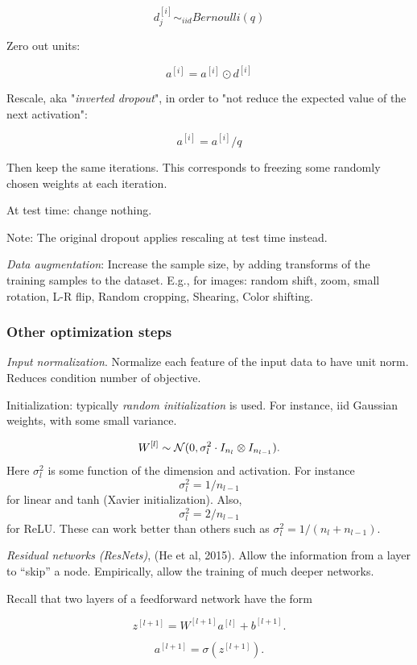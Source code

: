 \documentclass[english]{article}
\begin{document}
$$ d^{[i]}_j \sim_{iid} Bernoulli(q)$$

Zero out units:

$$a^{[i]} = a^{[i]}\odot d^{[i]}$$

Rescale, aka "\emph{inverted dropout}", in order to "not reduce the expected value of the next activation": 

$$a^{[i]} = a^{[i]}/q$$


Then keep the same iterations. This corresponds to freezing some randomly chosen weights at each iteration.

At test time: change nothing. 

Note: The original dropout applies rescaling at test time instead. 

\item 
\emph{Data augmentation}: Increase the sample size, by adding transforms of the training samples to the dataset. E.g., for images: random shift, zoom, small rotation, L-R flip, Random cropping, Shearing, Color shifting. 
\eenum 

\subsubsection{Other optimization steps}


\benum
\item \emph{Input normalization}. Normalize each feature of the input data to have unit norm. Reduces condition number of objective. 

\item 
Initialization: typically \emph{random initialization} is used. For instance, iid Gaussian weights, with some small variance. 

$$W^{[l]} \sim \mathcal{N}(0, \sigma^2_l \cdot I_{n_l}\otimes I_{n_{l-1}}).$$
 Here $\sigma^2_l$ is some function of the dimension and activation. For instance $$\sigma^2_l = 1/n_{l-1}$$ for linear and tanh (Xavier initialization). Also, $$\sigma^2_l = 2/n_{l-1}$$ for ReLU. These can work better than others such as $\sigma^2_l = 1/(n_l+n_{l-1})$.

\item \emph{Residual networks (ResNets)}, (He et al, 2015). Allow the information from a layer to ``skip'' a node.  Empirically, allow the training of much deeper networks. 

Recall that two layers of a feedforward network have the form

$$z^{[l+1]} = W^{[l+1]}a^{[l]}+b^{[l+1]}.$$

$$a^{[l+1]} = \sigma(z^{[l+1]}).$$
\end{document}
